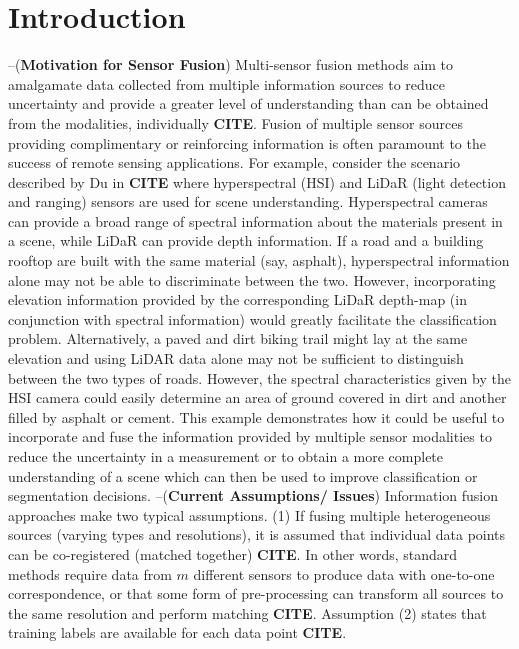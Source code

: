 \chapter{Introduction}
\vspace{1cm}\noindent --(\textbf{Motivation for Sensor Fusion}) \newline
Multi-sensor fusion methods aim to amalgamate data collected from multiple information sources to reduce uncertainty and provide a greater level of understanding than can be obtained from the modalities, individually \textbf{CITE}.  Fusion of multiple sensor sources providing complimentary or reinforcing information is often paramount to the success of remote sensing applications.  For example, consider the scenario described by Du in \textbf{CITE} where hyperspectral (HSI) and LiDaR (light detection and ranging) sensors are used for scene understanding. Hyperspectral cameras can provide a broad range of spectral information about the materials present in a scene, while LiDaR can provide depth information.  If a road and a building rooftop are built with the same material (say, asphalt), hyperspectral information alone may not be able to discriminate between the two. However, incorporating elevation information provided by the corresponding LiDaR depth-map (in conjunction with spectral information) would greatly facilitate the classification problem.  Alternatively, a paved and dirt biking trail might lay at the same elevation and using LiDAR data alone may not be sufficient to distinguish between the two types of roads.  However, the spectral characteristics given by the HSI camera could easily determine an area of ground covered in dirt and another filled by asphalt or cement.  This example demonstrates how it could be useful to incorporate and fuse the information provided by multiple sensor modalities to reduce the uncertainty in a measurement or to obtain a more complete understanding of a scene which can then be used to improve classification or segmentation decisions.
\newline
\vspace{1cm}\noindent --(\textbf{Current Assumptions/ Issues}) \newline
Information fusion approaches make two typical assumptions. (1) If fusing multiple heterogeneous sources (varying types and resolutions), it is assumed that individual data points can be co-registered (matched together) \textbf{CITE}. In other words, standard methods require data from $m$ different sensors to produce data with one-to-one correspondence, or that some form of pre-processing can transform all sources to the same resolution and perform matching \textbf{CITE}.  Assumption (2) states that training labels are available for each data point \textbf{CITE}. 
